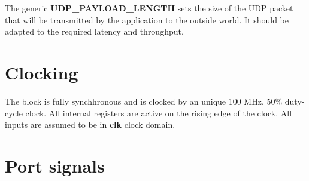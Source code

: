 \documentclass[a4paper]{hitec}
\newcommand{\signal}[1]{\textbf{#1}}
\begin{document}
The generic \signal{UDP\_PAYLOAD\_LENGTH} sets the size of the UDP packet that will be transmitted by the application to the outside world. It should be adapted to the required latency and throughput.



\section{Clocking}

The block is fully synchhronous and is clocked by an unique 100 MHz, 50\% duty-cycle clock. All internal registers are active on the rising edge of the clock. All inputs are assumed to be in \signal{clk} clock domain.



\section{Port signals}
\end{document}
